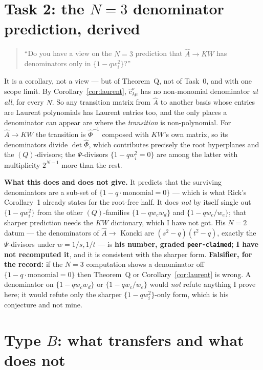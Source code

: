 \documentclass[11pt]{article}
\theoremstyle{definition}
\newcommand{\Ah}{\widehat{A}}
\begin{document}
\section{Task 2: the \texorpdfstring{$N=3$}{N=3} denominator prediction, derived}
\label{sec:task2}

\begin{quote}\small
``Do you have a view on the $N=3$ prediction that $\Ah\to KW$ has denominators
only in $\{1-qw_i^{2}\}$?''
\end{quote}

It is a corollary, not a view --- but of Theorem~Q, not of Task~0, and with one
scope limit.  By Corollary~\ref{cor:laurent}, $\hat c^{\nu}_{\lambda\mu}$ has no
non-monomial denominator \emph{at all}, for every $N$.  So any transition matrix
from $\Ah$ to another basis whose entries are Laurent polynomials has Laurent
entries too, and the only places a denominator can appear are where the
\emph{transition} is non-polynomial.  For $\Ah\to KW$ the transition is
$\widehat\Phi^{-1}$ composed with $KW$'s own matrix, so its denominators divide
$\det\widehat\Phi$, which contributes precisely the root hyperplanes and the
$(Q)$-divisors; the $\Psi$-divisors $\{1-qw_i^{2}=0\}$ are among the latter with
multiplicity $2^{N-1}$ more than the rest.

\textbf{What this does and does not give.}  It predicts that the surviving
denominators are a sub-set of $\{1-q\cdot\text{monomial}=0\}$ --- which is what
Rick's Corollary~1 already states for the root-free half.  It does \emph{not}
by itself single out $\{1-qw_i^{2}\}$ from the other $(Q)$-families
$\{1-qw_cw_d\}$ and $\{1-qw_c/w_e\}$; that sharper prediction needs the $KW$
dictionary, which I have not got.  His $N=2$ datum --- the denominators of
$\Ah\to$ Koncki are $(s^{2}-q)(t^{2}-q)$, exactly the $\Psi$-divisors under
$w=1/s,1/t$ --- is \textbf{his number, graded \texttt{peer-claimed}; I have not
recomputed it}, and it is consistent with the sharper form.
\textbf{Falsifier, for the record:} if the $N=3$ computation shows a denominator
off $\{1-q\cdot\text{monomial}=0\}$ then Theorem~Q or
Corollary~\ref{cor:laurent} is wrong.  A denominator on $\{1-qw_cw_d\}$ or
$\{1-qw_c/w_e\}$ would \emph{not} refute anything I prove here; it would refute
only the sharper $\{1-qw_i^2\}$-only form, which is his conjecture and not mine.

\section{Type \texorpdfstring{$B$}{B}: what transfers and what does not}
\label{sec:typeB}
\end{document}
